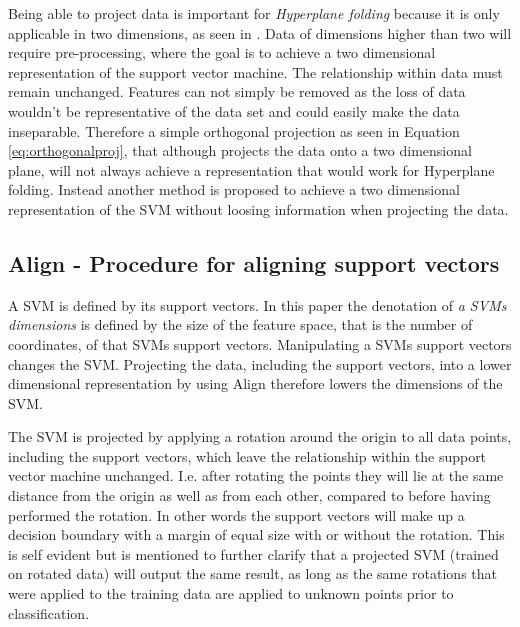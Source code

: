 \documentclass[a4paper,twoside]{bth}
\begin{document}
\par Being able to project data is important for \textit{Hyperplane folding} because it is only applicable in two dimensions, as seen in \cite{unpublished}. Data of dimensions higher than two will require pre-processing, where the goal is to achieve a two dimensional representation of the support vector machine. The relationship within data must remain unchanged. Features can not simply be removed as the loss of data wouldn't be representative of the data set and could easily make the data inseparable. Therefore a simple orthogonal projection as seen in Equation \ref{eq:orthogonalproj}, that although projects the data onto a two dimensional plane, will not always achieve a representation that would work for Hyperplane folding. Instead another method is proposed to achieve a two dimensional representation of the SVM without loosing information when projecting the data. 

\subsection{Align - Procedure for aligning support vectors}
A SVM is defined by its support vectors. In this paper the denotation of \textit{a SVMs dimensions} is defined by the size of the feature space, that is the number of coordinates, of that SVMs support vectors. Manipulating a SVMs support vectors changes the SVM. Projecting the data, including the support vectors, into a lower dimensional representation by using Align therefore lowers the dimensions of the SVM.

\par The SVM is projected by applying a rotation around the origin to all data points, including the support vectors, which leave the relationship within the support vector machine unchanged. I.e. after rotating the points they will lie at the same distance from the origin as well as from each other, compared to before having performed the rotation. In other words the support vectors will make up a decision boundary with a margin of equal size with or without the rotation. This is self evident but is mentioned to further clarify that a projected SVM (trained on rotated data) will output the same result, as long as the same rotations that were applied to the training data are applied to unknown points prior to classification.
\end{document}
